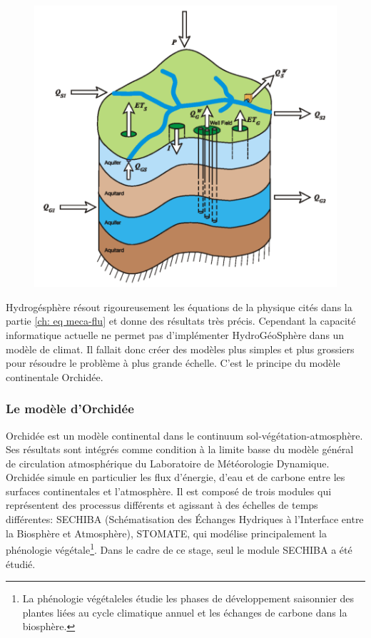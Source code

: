 \documentclass[a4paper,11pt]{article}
\numberwithin{equation}{section}
\begin{document}
\begin{figure}[H]
	\begin{center}
		\includegraphics[scale=0.35]{HGS_modele.png}
	\end{center}
	\label{fig-HGS_water_balance}
\end{figure}

Hydrogésphère résout rigoureusement les équations de la physique cités dans la partie \ref{ch: eq meca-flu} et donne des résultats très précis. Cependant la capacité informatique actuelle ne permet pas d'implémenter HydroGéoSphère dans un modèle de climat. Il fallait donc créer des modèles plus simples et plus grossiers pour résoudre le problème à plus grande échelle. C'est le principe du modèle continentale Orchidée.

\subsubsection{Le modèle d'Orchidée}

Orchidée est un modèle continental dans le continuum sol-végétation-atmosphère. Ses résultats sont intégrés comme condition à la limite basse du modèle général de circulation atmosphérique du Laboratoire de Météorologie Dynamique. Orchidée simule en particulier les flux d’énergie, d’eau et de carbone entre les surfaces continentales et l’atmosphère. Il est composé de trois modules qui représentent des processus différents et agissant à des échelles de temps différentes: SECHIBA (Schématisation des Échanges Hydriques à l’Interface entre la Biosphère et Atmosphère), STOMATE, qui modélise principalement la phénologie végétale\footnote{La phénologie végétaleles étudie les phases de développement saisonnier des plantes liées au cycle climatique annuel et les échanges de carbone dans la biosphère.}. Dans le cadre de ce stage, seul le module SECHIBA a été étudié.
\end{document}
